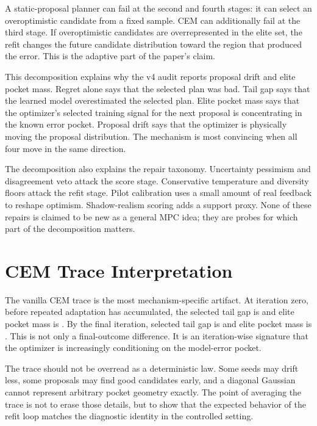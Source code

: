 A static-proposal planner can fail at the second and fourth stages: it can
select an overoptimistic candidate from a fixed sample. CEM can additionally
fail at the third stage. If overoptimistic candidates are overrepresented in
the elite set, the refit changes the future candidate distribution toward the
region that produced the error. This is the adaptive part of the paper's
claim.

This decomposition explains why the v4 audit reports proposal drift and elite
pocket mass. Regret alone says that the selected plan was bad. Tail gap says
that the learned model overestimated the selected plan. Elite pocket mass says
that the optimizer's selected training signal for the next proposal is
concentrating in the known error pocket. Proposal drift says that the optimizer
is physically moving the proposal distribution. The mechanism is most
convincing when all four move in the same direction.

The decomposition also explains the repair taxonomy. Uncertainty pessimism and
disagreement veto attack the score stage. Conservative temperature and
diversity floors attack the refit stage. Pilot calibration uses a small amount
of real feedback to reshape optimism. Shadow-realism scoring adds a support
proxy. None of these repairs is claimed to be new as a general MPC idea; they
are probes for which part of the decomposition matters.

\section{CEM Trace Interpretation}
\label{app:trace-interpretation}

The vanilla CEM trace is the most mechanism-specific artifact. At iteration
zero, before repeated adaptation has accumulated, the selected tail gap is
\VFourTraceTailGapStart{} and elite pocket mass is
\VFourTracePocketStart{}. By the final iteration, selected tail gap is
\VFourTraceTailGapEnd{} and elite pocket mass is
\VFourTracePocketEnd{}. This is not only a final-outcome difference. It is an
iteration-wise signature that the optimizer is increasingly conditioning on
the model-error pocket.

The trace should not be overread as a deterministic law. Some seeds may drift
less, some proposals may find good candidates early, and a diagonal Gaussian
cannot represent arbitrary pocket geometry exactly. The point of averaging the
trace is not to erase those details, but to show that the expected behavior of
the refit loop matches the diagnostic identity in the controlled setting.

